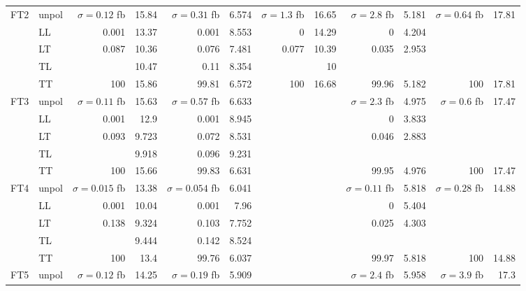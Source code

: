 \begin{table}[h]
{\begin{tabular}{llrrrrrrrrrr}
\midrule
\multirow{5}{*}{FT2}
 & unpol & $\sigma = \num{0.12}$ fb & \num{15.84} & $\sigma = \num{0.31}$ fb & \num{6.574} & $\sigma = \num{1.3}$ fb & \num{16.65} & $\sigma = \num{2.8}$ fb & \num{5.181} & $\sigma = \num{0.64}$ fb & \num{17.81} \\
 & LL & \num{0.001} & \num{13.37} & \num{0.001} & \num{8.553} & \num{0} & \num{14.29} & \num{0} & \num{4.204} &  &  \\
 & LT & \num{0.087} & \num{10.36} & \num{0.076} & \num{7.481} & \num{0.077} & \num{10.39} & \num{0.035} & \num{2.953} &  &  \\
 & TL &  & \num{10.47} & \num{0.11} & \num{8.354} &  & \num{10} &  &  &  &  \\
 & TT & \num{100} & \num{15.86} & \num{99.81} & \num{6.572} & \num{100} & \num{16.68} & \num{99.96} & \num{5.182} & \num{100} & \num{17.81} \\
\midrule
\multirow{5}{*}{FT3}
 & unpol & $\sigma = \num{0.11}$ fb & \num{15.63} & $\sigma = \num{0.57}$ fb & \num{6.633} &  &  & $\sigma = \num{2.3}$ fb & \num{4.975} & $\sigma = \num{0.6}$ fb & \num{17.47} \\
 & LL & \num{0.001} & \num{12.9} & \num{0.001} & \num{8.945} &  &  & \num{0} & \num{3.833} &  &  \\
 & LT & \num{0.093} & \num{9.723} & \num{0.072} & \num{8.531} &  &  & \num{0.046} & \num{2.883} &  &  \\
 & TL &  & \num{9.918} & \num{0.096} & \num{9.231} &  &  &  &  &  &  \\
 & TT & \num{100} & \num{15.66} & \num{99.83} & \num{6.631} &  &  & \num{99.95} & \num{4.976} & \num{100} & \num{17.47} \\
\midrule
\multirow{5}{*}{FT4}
 & unpol & $\sigma = \num{0.015}$ fb & \num{13.38} & $\sigma = \num{0.054}$ fb & \num{6.041} &  &  & $\sigma = \num{0.11}$ fb & \num{5.818} & $\sigma = \num{0.28}$ fb & \num{14.88} \\
 & LL & \num{0.001} & \num{10.04} & \num{0.001} & \num{7.96} &  &  & \num{0} & \num{5.404} &  &  \\
 & LT & \num{0.138} & \num{9.324} & \num{0.103} & \num{7.752} &  &  & \num{0.025} & \num{4.303} &  &  \\
 & TL &  & \num{9.444} & \num{0.142} & \num{8.524} &  &  &  &  &  &  \\
 & TT & \num{100} & \num{13.4} & \num{99.76} & \num{6.037} &  &  & \num{99.97} & \num{5.818} & \num{100} & \num{14.88} \\
\midrule
\multirow{5}{*}{FT5}
 & unpol & $\sigma = \num{0.12}$ fb & \num{14.25} & $\sigma = \num{0.19}$ fb & \num{5.909} &  &  & $\sigma = \num{2.4}$ fb & \num{5.958} & $\sigma = \num{3.9}$ fb & \num{17.3} \\

\end{tabular}}
\end{table}
